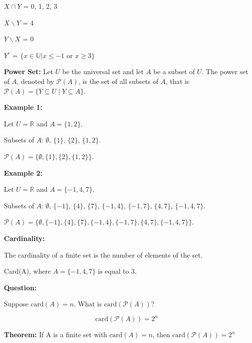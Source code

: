 \documentclass[12pt]{article}
\begin{document}
$X \cap Y$ = 0, 1, 2, 3

$X \backslash Y$ = 4

$Y \backslash X$ = 0

$Y^c$ = $\{ x \in \mathbb{U} | x \leq -1 $ or $ x \geq 3 \}$

\newpage

\textbf{Power Set:} Let $U$ be the universal set and let $A$ be a subset of $U$. The power set of $A$, denoted by $\mathcal{P}(A)$, is the set of all subsets of $A$, that is $\mathcal{P}(A) = \{Y \subseteq U \mid Y \subseteq A\}$.

\smallbreak

\textbf{Example 1:}

Let $U = \mathbb{R}$ and $A = \{1, 2\}$.

Subsets of $A$: $\emptyset$, $\{1\}$, $\{2\}$, $\{1, 2\}$.

$\mathcal{P}(A) = \{\emptyset, \{1\}, \{2\}, \{1, 2\}\}$.

\smallbreak

\textbf{Example 2:}

Let $U = \mathbb{R}$ and $A = \{-1, 4, 7\}$.

Subsets of $A$: $\emptyset$, $\{-1\}$, $\{4\}$, $\{7\}$, $\{-1, 4\}$, $\{-1, 7\}$, $\{4, 7\}$, $\{-1, 4, 7\}$.

$\mathcal{P}(A) = \{\emptyset, \{-1\}, \{4\}, \{7\}, \{-1, 4\}, \{-1, 7\}, \{4, 7\}, \{-1, 4, 7\}\}$.

\medbreak

\textbf{Cardinality: }

The cardinality of a finite set is the number of elements of the set.

Card(A), where $A = \{-1, 4, 7\}$ is equal to 3. 

\textbf{Question: }

Suppose $\text{card}(A) = n$. What is $\text{card}(\mathcal{P}(A))$?

\[
\text{card}(\mathcal{P}(A)) = 2^n
\]

\medbreak

\textbf{Theorem: } If A is a finite set with $\text{card}(A) = n$, then $\text{card}(\mathcal{P}(A)) = 2^n$
\end{document}
